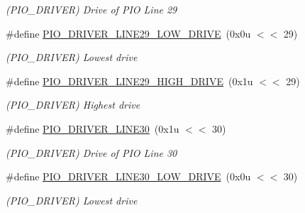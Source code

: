 \begin{DoxyCompactItemize}
\begin{DoxyCompactList}\small\item\em (P\+I\+O\+\_\+\+D\+R\+I\+V\+ER) Drive of P\+IO Line 29 \end{DoxyCompactList}\item 
\mbox{\label{group__SAME70__PIO_gaeecaf91d3616669a6689234bc22e7ebe}} 
\#define \mbox{\hyperlink{group__SAME70__PIO_gaeecaf91d3616669a6689234bc22e7ebe}{P\+I\+O\+\_\+\+D\+R\+I\+V\+E\+R\+\_\+\+L\+I\+N\+E29\+\_\+\+L\+O\+W\+\_\+\+D\+R\+I\+VE}}~(0x0u $<$$<$ 29)
\begin{DoxyCompactList}\small\item\em (P\+I\+O\+\_\+\+D\+R\+I\+V\+ER) Lowest drive \end{DoxyCompactList}\item 
\mbox{\label{group__SAME70__PIO_gaf51d196e5ff9962ee794fb5947af5386}} 
\#define \mbox{\hyperlink{group__SAME70__PIO_gaf51d196e5ff9962ee794fb5947af5386}{P\+I\+O\+\_\+\+D\+R\+I\+V\+E\+R\+\_\+\+L\+I\+N\+E29\+\_\+\+H\+I\+G\+H\+\_\+\+D\+R\+I\+VE}}~(0x1u $<$$<$ 29)
\begin{DoxyCompactList}\small\item\em (P\+I\+O\+\_\+\+D\+R\+I\+V\+ER) Highest drive \end{DoxyCompactList}\item 
\mbox{\label{group__SAME70__PIO_gaaeb8a8eaa1186c9e420d992160698b34}} 
\#define \mbox{\hyperlink{group__SAME70__PIO_gaaeb8a8eaa1186c9e420d992160698b34}{P\+I\+O\+\_\+\+D\+R\+I\+V\+E\+R\+\_\+\+L\+I\+N\+E30}}~(0x1u $<$$<$ 30)
\begin{DoxyCompactList}\small\item\em (P\+I\+O\+\_\+\+D\+R\+I\+V\+ER) Drive of P\+IO Line 30 \end{DoxyCompactList}\item 
\mbox{\label{group__SAME70__PIO_ga056de8768c93d529a84971215bd2f0c1}} 
\#define \mbox{\hyperlink{group__SAME70__PIO_ga056de8768c93d529a84971215bd2f0c1}{P\+I\+O\+\_\+\+D\+R\+I\+V\+E\+R\+\_\+\+L\+I\+N\+E30\+\_\+\+L\+O\+W\+\_\+\+D\+R\+I\+VE}}~(0x0u $<$$<$ 30)
\begin{DoxyCompactList}\small\item\em (P\+I\+O\+\_\+\+D\+R\+I\+V\+ER) Lowest drive \end{DoxyCompactList}\item 

\end{DoxyCompactItemize}
